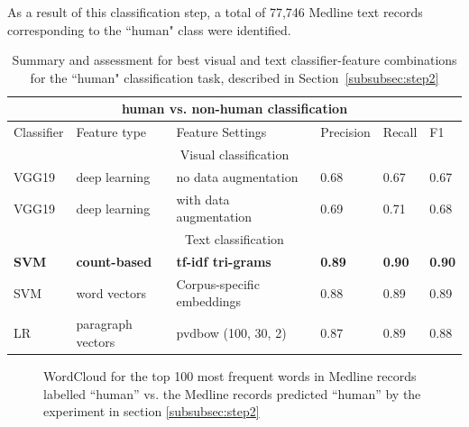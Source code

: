 \documentclass[]{spie}  %
\begin{document}
As a result of this classification step, a total of 77,746 Medline text records corresponding to the ``human" class were identified.
\vspace{5mm}
\begin{table}[!htbp]
\caption{Summary and assessment for best visual and text classifier-feature combinations for the ``human" classification task, described in Section~\ref{subsubsec:step2}}
\label{table:1}
\centering
\begin{tabular}{ |p{1.5cm}|p{3.0cm}|p{5.0cm}|p{1.5cm}|p{1.5cm}|p{1.5cm}|  }
 \hline
 \multicolumn{6}{|c|}{human vs. non-human classification} \\
 \hline
 Classifier & Feature type & Feature Settings & Precision & Recall & F1\\
 \hline
\multicolumn{6}{|c|}{Visual classification} \\
\hline
VGG19 & deep learning & no data augmentation & 0.68 & 0.67 & 0.67 \\
VGG19 & deep learning & with data augmentation & 0.69 & 0.71 & 0.68 \\
\hline
\multicolumn{6}{|c|}{Text classification} \\
\hline
\textbf{SVM}   & \textbf{count-based} & \textbf{tf-idf tri-grams}    & \textbf{0.89} &  \textbf{0.90} &   \textbf{0.90} \\
 SVM & word vectors &   Corpus-specific embeddings  & 0.88   & 0.89 &   0.89\\
 LR & paragraph vectors & pvdbow (100, 30, 2) & 0.87 & 0.89 & 0.88 \\
 \hline
 \end{tabular}
\end{table}
\vspace{5mm}
%
\begin{figure}%
    \centering
    \caption{WordCloud for the top 100 most frequent words in Medline records labelled ``human'' vs. the Medline records predicted ``human'' by the experiment in section \ref{subsubsec:step2}}%
    \label{fig:wordcloud_human}
\end{figure}
\end{document}
